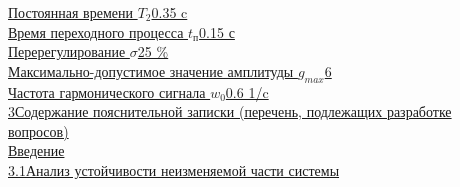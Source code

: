 \documentclass[fleqn, a4paper, 12pt, russian]{article}
\begin{document}
	{\fontsize{14pt}{0cm}\selectfont \underline{Постоянная времени $T_2$\hspace{10.1cm}0.35 c\hspace{0.4cm}}} \\ \vspace{0.2cm}
	{\fontsize{14pt}{0cm}\selectfont \underline{Время переходного процесса $t_\text{п}$\hspace{8.4cm}0.15 с\hspace{0.6cm}}} \\ \vspace{0.2cm}
	{\fontsize{14pt}{0cm}\selectfont \underline{Перерегулирование $\sigma$\hspace{10.8cm}25 \% \hspace{0.2cm}}} \\ \vspace{0.2cm}
	{\fontsize{14pt}{0cm}\selectfont \underline{Максимально-допустимое значение амплитуды ${g}_{max}$\hspace{4.8cm}6 \hspace{0.2cm}}} \\ \vspace{0.2cm}
	{\fontsize{14pt}{0cm}\selectfont \underline{Частота гармонического сигнала $w_{0}$\hspace{7.3cm}0.6 1/c\hspace{0.4cm}}} \\ \vspace{0.2cm}
	\newpage
	{\fontsize{14pt}{0cm}\selectfont \underline{3\hspace{0.5cm}Содержание пояснительной записки (перечень, подлежащих разработке\hspace{0.2cm}}\\\underline{\hspace{0.8cm}вопросов)\hspace{14cm}}} \\ \vspace{0.2cm}
	{\fontsize{14pt}{0cm}\selectfont \underline{\hspace{1.8cm}Введение\hspace{13.15cm}}} \\ \vspace{0.2cm}
	{\fontsize{14pt}{0cm}\selectfont \underline{\hspace{0.8cm}3.1\hspace{0.36cm}Анализ устойчивости неизменяемой части системы \hspace{3.65cm}}} \\ \vspace{0.2cm}
\end{document}
